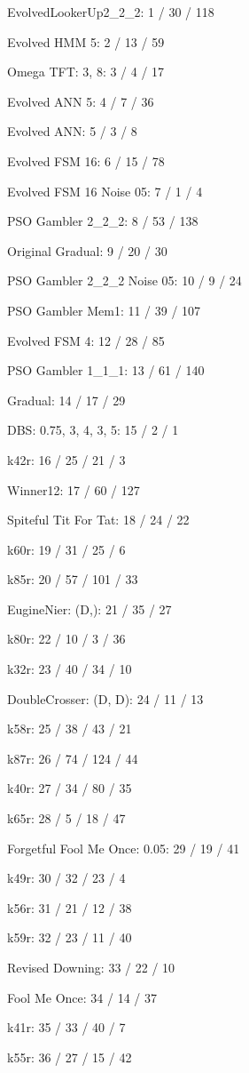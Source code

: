\item EvolvedLookerUp2_2_2: 1 / 30 / 118
\item Evolved HMM 5: 2 / 13 / 59
\item Omega TFT: 3, 8: 3 / 4 / 17
\item Evolved ANN 5: 4 / 7 / 36
\item Evolved ANN: 5 / 3 / 8
\item Evolved FSM 16: 6 / 15 / 78
\item Evolved FSM 16 Noise 05: 7 / 1 / 4
\item PSO Gambler 2_2_2: 8 / 53 / 138
\item Original Gradual: 9 / 20 / 30
\item PSO Gambler 2_2_2 Noise 05: 10 / 9 / 24
\item PSO Gambler Mem1: 11 / 39 / 107
\item Evolved FSM 4: 12 / 28 / 85
\item PSO Gambler 1_1_1: 13 / 61 / 140
\item Gradual: 14 / 17 / 29
\item DBS: 0.75, 3, 4, 3, 5: 15 / 2 / 1
\item k42r: 16 / 25 / 21 / 3
\item Winner12: 17 / 60 / 127
\item Spiteful Tit For Tat: 18 / 24 / 22
\item k60r: 19 / 31 / 25 / 6
\item k85r: 20 / 57 / 101 / 33
\item EugineNier: (D,): 21 / 35 / 27
\item k80r: 22 / 10 / 3 / 36
\item k32r: 23 / 40 / 34 / 10
\item DoubleCrosser: (D, D): 24 / 11 / 13
\item k58r: 25 / 38 / 43 / 21
\item k87r: 26 / 74 / 124 / 44
\item k40r: 27 / 34 / 80 / 35
\item k65r: 28 / 5 / 18 / 47
\item Forgetful Fool Me Once: 0.05: 29 / 19 / 41
\item k49r: 30 / 32 / 23 / 4
\item k56r: 31 / 21 / 12 / 38
\item k59r: 32 / 23 / 11 / 40
\item Revised Downing: 33 / 22 / 10
\item Fool Me Once: 34 / 14 / 37
\item k41r: 35 / 33 / 40 / 7
\item k55r: 36 / 27 / 15 / 42
